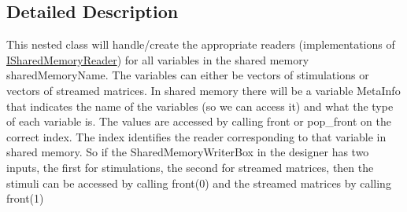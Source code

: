 \subsection{Detailed Description}
This nested class will handle/create the appropriate readers (implementations of \hyperlink{classOpenViBEApplications_1_1ISharedMemoryReader}{ISharedMemoryReader}) for all variables in the shared memory sharedMemoryName. The variables can either be vectors of stimulations or vectors of streamed matrices. In shared memory there will be a variable MetaInfo that indicates the name of the variables (so we can access it) and what the type of each variable is. The values are accessed by calling front or pop\_\-front on the correct index. The index identifies the reader corresponding to that variable in shared memory. So if the SharedMemoryWriterBox in the designer has two inputs, the first for stimulations, the second for streamed matrices, then the stimuli can be accessed by calling front(0) and the streamed matrices by calling front(1) 

